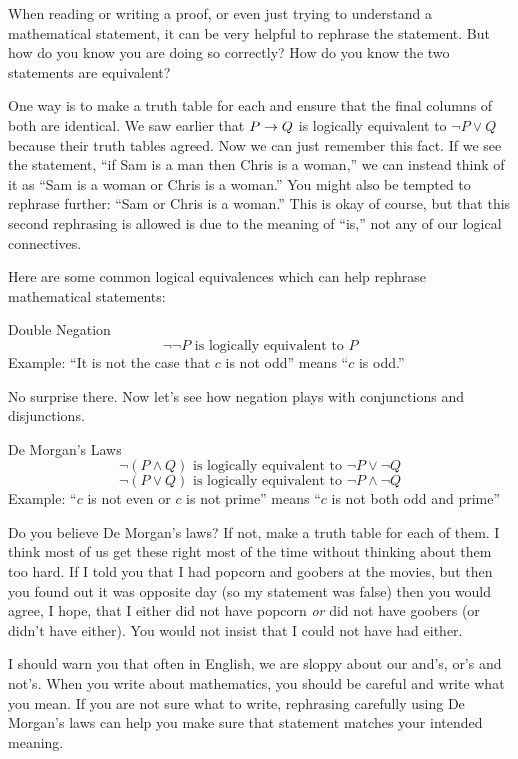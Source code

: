 \documentclass[12pt]{article}
\begin{document}
When reading or writing a proof, or even just trying to understand a mathematical statement, it can be very helpful to rephrase the statement.  But how do you know you are doing so correctly?  How do you know the two statements are equivalent?

One way is to make a truth table for each and ensure that the final columns of both are identical.  
We saw earlier that $P \rightarrow Q$ is logically equivalent to $\neg P \vee Q$ because their truth tables agreed.  Now we can just remember this fact.  If we see the statement, ``if Sam is a man then Chris is a woman,'' we can instead think of it as ``Sam is a woman or Chris is a woman.''  You might also be tempted to rephrase further: ``Sam or Chris is a woman.''  This is okay of course, but that this second rephrasing is allowed is due to the meaning of ``is,'' not any of our logical connectives.  

Here are some common logical equivalences which can help rephrase mathematical statements:

\begin{defbox}{Double Negation}
  \[\neg \neg P \mbox{ is logically equivalent to } P\]
  Example: ``It is not the case that $c$ is not odd'' means ``$c$ is odd.''
\end{defbox}

No surprise there.  Now let's see how negation plays with conjunctions and disjunctions.

\begin{defbox}{De Morgan's Laws}
  \[\neg(P \wedge Q) \mbox{ is logically equivalent to } \neg P \vee \neg Q\]
  \[\neg(P \vee Q) \mbox{ is logically equivalent to } \neg P \wedge \neg Q\]
  Example: ``$c$ is not even or $c$ is not prime'' means ``$c$ is not both odd and prime''
\end{defbox}

Do you believe De Morgan's laws?  If not, make a truth table for each of them.  I think most of us get these right most of the time without thinking about them too hard.  If I told you that I had popcorn and goobers at the movies, but then you found out it was opposite day (so my statement was false) then you would agree, I hope, that I either did not have popcorn {\em or} did not have goobers (or didn't have either).  You would not insist that I could not have had either.

I should warn you that often in English, we are sloppy about our and's, or's and not's.  When you write about mathematics, you should be careful and write what you mean.  If you are not sure what to write, rephrasing carefully using De Morgan's laws can help you make sure that statement matches your intended meaning.
\end{document}
